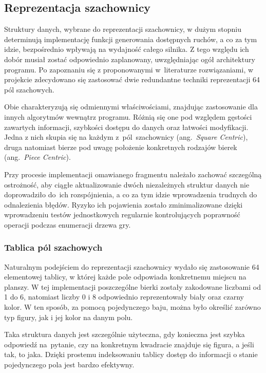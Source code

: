 \subsection{Reprezentacja szachownicy}
\label{subsec:reprezentacja-szachownicy}

Struktury danych, wybrane do reprezentacji szachownicy, w dużym stopniu determinują implementację funkcji generowania dostępnych ruchów, a co za tym idzie, bezpośrednio wpływają na wydajność całego silnika.
Z tego względu ich dobór musiał zostać odpowiednio zaplanowany, uwzględniając ogół architektury programu.
Po zapoznaniu się z proponowanymi w~literaturze rozwiązaniami, w projekcie zdecydowano się zastosować dwie redundantne techniki reprezentacji 64 pól szachowych.

Obie charakteryzują się odmiennymi właściwościami, znajdując zastosowanie dla innych algorytmów wewnątrz programu.
Różnią się one pod względem gęstości zawartych informacji, szybkości dostępu do danych oraz łatwości modyfikacji.
Jedna z nich skupia się na każdym z~pól~szachownicy (ang.~\emph{Square Centric}), druga natomiast bierze pod uwagę położenie konkretnych rodzajów bierek (ang.~\emph{Piece Centric}).

Przy procesie implementacji omawianego fragmentu należało zachować szczególną ostrożność, aby ciągłe aktualizowanie dwóch niezależnych struktur danych nie doprowadziło do~ich rozspójnienia, a co za tym idzie wprowadzenia trudnych do odnalezienia błędów.
Ryzyko ich pojawienia zostało zminimalizowane dzięki wprowadzeniu testów jednostkowych regularnie kontrolujących poprawność operacji podczas enumeracji drzewa gry.
\subsubsection{Tablica pól szachowych}

Naturalnym podejściem do reprezentacji szachownicy wydało się zastosowanie 64 elementowej tablicy, w której każde pole odpowiada konkretnemu miejscu na planszy.
W tej implementacji poszczególne bierki zostały zakodowane liczbami od 1 do 6, natomiast liczby 0 i 8 odpowiednio reprezentowały biały oraz czarny kolor.
W ten sposób, za pomocą pojedynczego baju, można było określić zarówno typ figury, jak i jej kolor na danym polu.

Taka struktura danych jest szczególnie użyteczna, gdy konieczna jest szybka odpowiedź na~pytanie, czy na konkretnym kwadracie znajduje się figura, a jeśli tak, to jaka.
Dzięki prostemu indeksowaniu tablicy dostęp do informacji o stanie pojedynczego pola jest bardzo efektywny.

